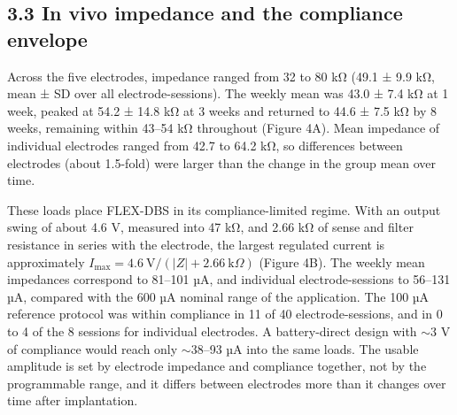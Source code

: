 \subsection{3.3 In vivo impedance and the compliance envelope}\label{in-vivo-impedance-and-the-compliance-envelope}

Across the five electrodes, impedance ranged from 32 to 80 kΩ (49.1 ± 9.9 kΩ, mean ± SD over all electrode-sessions). The weekly mean was 43.0 ± 7.4 kΩ at 1 week, peaked at 54.2 ± 14.8 kΩ at 3 weeks and returned to 44.6 ± 7.5 kΩ by 8 weeks, remaining within 43--54 kΩ throughout (Figure 4A). Mean impedance of individual electrodes ranged from 42.7 to 64.2 kΩ, so differences between electrodes (about 1.5-fold) were larger than the change in the group mean over time.

These loads place FLEX-DBS in its compliance-limited regime. With an output swing of about 4.6 V, measured into 47 kΩ, and 2.66 kΩ of sense and filter resistance in series with the electrode, the largest regulated current is approximately $I_\mathrm{max} = 4.6\ \mathrm{V} / (|Z| + 2.66\ \mathrm{k}\Omega)$ (Figure 4B). The weekly mean impedances correspond to 81--101 µA, and individual electrode-sessions to 56--131 µA, compared with the 600 µA nominal range of the application. The 100 µA reference protocol was within compliance in 11 of 40 electrode-sessions, and in 0 to 4 of the 8 sessions for individual electrodes. A battery-direct design with $\sim$3 V of compliance would reach only $\sim$38--93 µA into the same loads. The usable amplitude is set by electrode impedance and compliance together, not by the programmable range, and it differs between electrodes more than it changes over time after implantation.
